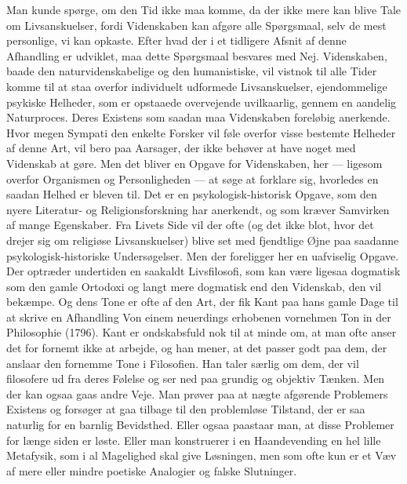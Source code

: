 \documentclass[12pt]{article}
\newcommand{\apage}[1]{\marginnote{\footnotesize\textit{[#1]}}}
\begin{document}
Man kunde spørge, om den Tid ikke maa komme, da der ikke mere kan blive Tale om
Livsanskuelser, fordi Videnskaben kan afgøre alle Spørgsmaal, selv de mest
personlige, vi kan opkaste. Efter hvad der i et tidligere Afsnit af denne
Afhandling er udviklet, maa dette Spørgsmaal besvares med Nej. Videnskaben,
baade den naturvidenskabelige og den humanistiske, vil vistnok til alle Tider
komme til at staa overfor individuelt udformede Livsanskuelser, ejendommelige
psykiske Helheder, som er opstaaede
\setcounter{footnote}{0}%
\apage{74}overvejende uvilkaarlig, gennem en aandelig Naturproces. Deres
Existens som saadan maa Videnskaben foreløbig anerkende. Hvor megen Sympati den
enkelte Forsker vil føle overfor visse bestemte Helheder af denne Art, vil bero
paa Aarsager, der ikke behøver at have noget med Videnskab at gøre. Men det
bliver en Opgave for Videnskaben, her --- ligesom overfor Organismen og
Personligheden --- at søge at forklare sig, hvorledes en saadan Helhed er
bleven til. Det er en psykologisk-historisk Opgave, som den nyere Literatur- og
Religionsforskning har anerkendt, og som kræver Samvirken af mange Egenskaber.
Fra Livets Side vil der ofte (og det ikke blot, hvor det drejer sig om
religiøse Livsanskuelser) blive set med fjendtlige Øjne paa saadanne
psykologisk-historiske Undersøgelser. Men der foreligger her en uafviselig
Opgave. Der optræder undertiden en saakaldt
\guillemotright{}Livsfilosofi\guillemotleft{}, som kan være ligesaa dogmatisk
som den gamle Ortodoxi og langt mere dogmatisk end den Videnskab, den vil
bekæmpe. Og dens Tone er ofte af den Art, der fik Kant paa hans gamle Dage til
at skrive en Afhandling \guillemotright{}Von einem neuerdings erhobenen
vornehmen Ton in der Philosophie\guillemotleft{} (1796). Kant er ondskabsfuld
nok til at minde om, at man ofte anser det for
\guillemotright{}fornemt\guillemotleft{} ikke at arbejde, og han mener, at det
passer godt paa dem, der anslaar den fornemme Tone i Filosofien. Han taler
særlig om dem, der vil filosofere ud fra deres Følelse og ser ned paa grundig
og objektiv Tænken. Men der kan ogsaa gaas andre Veje. Man prøver paa at nægte
afgørende Problemers Existens og forsøger at gaa tilbage til den problemløse
Tilstand, der er saa naturlig for en barnlig Bevidsthed. Eller ogsaa paastaar
man, at disse Problemer for længe siden er løste. Eller man konstruerer i en
Haandevending en hel lille Metafysik, som i al Magelighed
\setcounter{footnote}{0}%
\apage{75}skal give Løsningen, men som ofte kun er et Væv af mere eller mindre
poetiske Analogier og falske Slutninger.
\end{document}
